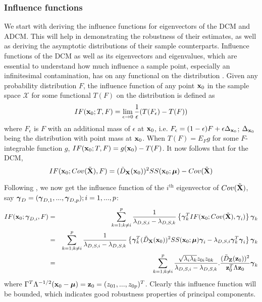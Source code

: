 \documentclass[fleqn,11pt]{article}
\begin{document}
\subsubsection{Influence functions}
We start with deriving the influence functions for eigenvectors of the DCM and ADCM. This will help in demonstrating the robustness of their estimates, as well as deriving the asymptotic distributions of their sample counterparts. Influence functions of the DCM as well as its eigenvectors and eigenvalues, which are essential to understand how much influence a sample point, especially an infinitesimal contamination, has on any functional on the distribution \citep{HampelBook86}. Given any probability distribution $F$, the influence function of any point ${\bf{x}}_0$ in the sample space $\mathcal{X}$ for some functional $T(F)$ on the distribution is defined as
%
$$ IF({\bf{x}}_0; T,F) = \lim_{\epsilon \rightarrow 0} \frac{1}{\epsilon} (T(F_\epsilon) - T(F)) $$
%
where $F_\epsilon$ is $F$ with an additional mass of $\epsilon$ at ${\bf{x}}_0$, i.e. $F_\epsilon = (1-\epsilon)F + \epsilon \Delta_{{\bf{x}}_0}$; $\Delta_{{\bf{x}}_0}$ being the distribution with point mass at ${\bf{x}}_0$. When $T(F) = E_F g$ for some $F$-integrable function $g$, $IF({\bf{x}}_0; T,F) = g({\bf{x}}_0) - T(F)$. It now follows that for the DCM,
%
$$ IF({\bf{x}}_0; Cov(\tilde {{\mathbf{X}}}), F) = (\tilde D_{\mathbf{X}}({\bf{x}}_0))^2 SS({\bf{x}}_0; {\boldsymbol{\mu}}) - Cov(\tilde {{\mathbf{X}}}) $$

Following \cite{croux00}, we now get the influence function of the $i^\text{th}$ eigenvector of $Cov(\tilde{{\mathbf{X}}})$, say ${\boldsymbol{\gamma}}_D = ({\boldsymbol{\gamma}}_{D,1},...,{\boldsymbol{\gamma}}_{D,p}); i = 1,...,p$:
%
\begin{eqnarray}
IF({\bf{x}}_0; {\boldsymbol{\gamma}}_{D,i}, F) &=& \sum_{k=1; k \neq i}^p \frac{1}{\lambda_{D,S,i} - \lambda_{D,S,k}} \left\{ {\boldsymbol{\gamma}}^T_k IF({\bf{x}}_0; Cov(\tilde {{\mathbf{X}}}), {\boldsymbol{\gamma}}_i) \right\} {\boldsymbol{\gamma}}_k \notag \\
&=& \sum_{k=1; k \neq i}^p \frac{1}{\lambda_{D,S,i} - \lambda_{D,S,k}} \left\{ {\boldsymbol{\gamma}}^T_k (\tilde D_{\mathbf{X}}({\bf{x}}_0))^2 SS({\bf{x}}_0; {\boldsymbol{\mu}}){\boldsymbol{\gamma}}_i - \lambda_{D,S,i}{\boldsymbol{\gamma}}_k^T{\boldsymbol{\gamma}}_i \right\} {\boldsymbol{\gamma}}_k \notag \\
&=& \sum_{k=1; k \neq i}^p \frac{\sqrt{\lambda_i \lambda_k} z_{0i} z_{0k}}{\lambda_{D,S,i} - \lambda_{D,S,k}}. \frac{(\tilde D_{\mathbf{Z}}({\bf{z}}_0))^2 }{{\bf{z}}_0^T \Lambda {\bf{z}}_0} {\boldsymbol{\gamma}}_k
\end{eqnarray}
%
where $\Gamma^T \Lambda^{-1/2} ({\bf{x}}_0 - {\boldsymbol{\mu}}) = {\bf{z}}_0 = (z_{01},...,z_{0p})^T$. Clearly this influence function will be bounded, which indicates good robustness properties of principal components.
\end{document}
